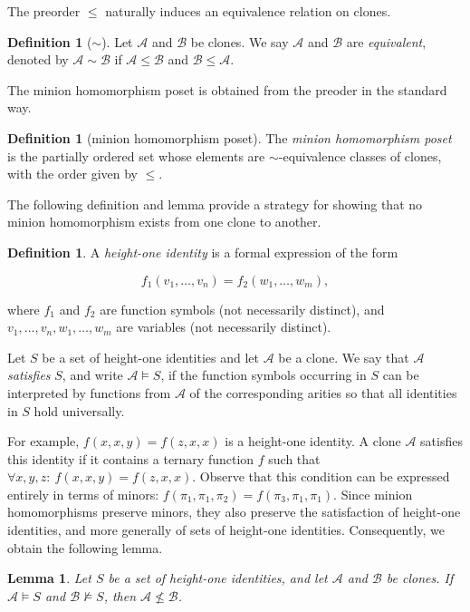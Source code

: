 \documentclass{amsart}
\numberwithin{equation}{section}
\theoremstyle{plain}
\newtheorem{lemma}[theorem]{Lemma}
\theoremstyle{definition}
\newtheorem{definition}[theorem]{Definition}
\def\clone#1{\mathcal{#1}}
\begin{document}
The preorder $\leq$ naturally induces an equivalence relation on clones.

\begin{definition}[$\sim$]
Let $\clone{A}$ and $\clone{B}$ be clones. We say $\clone{A}$ and $\clone{B}$ are {\it equivalent}, denoted by $\clone{A}\sim \clone{B}$ if $\clone{A}\leq \clone{B}$ and $\clone{B}\leq \clone{A}$.
\end{definition}

The minion homomorphism poset is obtained from the preoder in the standard way.

\begin{definition}[minion homomorphism poset]
The \emph{minion homomorphism poset} is the partially ordered set whose elements are $\sim$-equivalence classes of clones, with the order given by $\le$.    
\end{definition}


The following definition and lemma provide a strategy for showing that no minion homomorphism exists from one clone to another.

\begin{definition}
A {\em height-one identity} is a formal expression of the form

$$f_1(v_1,\dots,v_n)=f_2(w_1,\dots,w_m),$$

where $f_1$ and $f_2$ are function symbols (not necessarily distinct),
and $v_1,\dots,v_n,w_1,\dots,w_m$ are variables (not necessarily distinct).

Let $S$ be a set of height-one identities and let $\clone{A}$ be a clone.
We say that $\clone{A}$ {\em satisfies} $S$, and write
$\clone{A}\models S$, if the function symbols occurring in $S$ can be
interpreted by functions from $\clone{A}$ of the corresponding arities
so that all identities in $S$ hold universally.
\end{definition}

For example,
$f(x,x,y)=f(z,x,x)$
is a height-one identity. A clone $\clone{A}$ satisfies this identity if it
contains a ternary function $f$ such that
$\forall x,y,z\colon\ f(x,x,y)=f(z,x,x)$.
Observe that this condition can be expressed entirely in terms of minors:
$f(\pi_1,\pi_1,\pi_2)=f(\pi_3,\pi_1,\pi_1)$.
Since minion homomorphisms preserve minors, they also preserve the satisfaction
of height-one identities, and more generally of sets of height-one
identities. Consequently, we obtain the following lemma.

\begin{lemma}\label{identity-proof-strategy}
Let $S$ be a set of height-one identities, and let $\clone{A}$ and
$\clone{B}$ be clones. If
$\clone{A}\models S$
and
$\clone{B}\not\models S$,
then
$\clone{A}\not\leq \clone{B}$.
\end{lemma}
\end{document}
